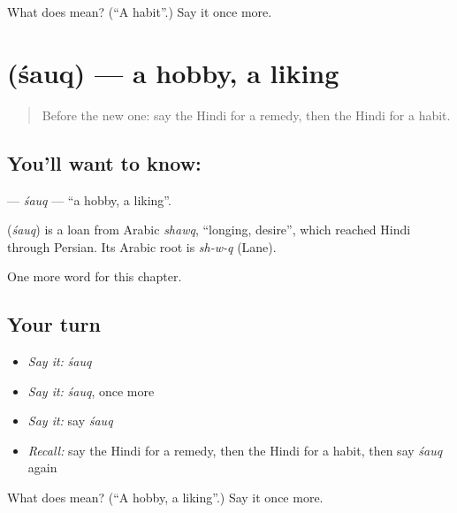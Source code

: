 \begin{tcolorbox}[breakable,colback=teal!4,colframe=teal!35!black,title={Before you move on}]
What does  mean? (\textquotedblleft{}A habit\textquotedblright{}.) Say it once more.
\end{tcolorbox}
\section[\texorpdfstring{\hi{शौक़} (śauq)}{शौक़ (śauq)}]{ (śauq) — a hobby, a liking}

\label{lesson:HI-C223-sauq}



\begin{quote}
Before the new one: say the Hindi for a remedy, then the Hindi for a habit.
\end{quote}

\subsection*{You'll want to know: }
\textbf{} — \emph{śauq} — \textquotedblleft{}a hobby, a liking\textquotedblright{}.

\begin{cousinweb}
\textbf{} (\emph{śauq}) is a loan from Arabic \emph{shawq}, \textquotedblleft{}longing, desire\textquotedblright{}, which reached Hindi through Persian. Its Arabic root is \emph{sh-w-q} (Lane).
\end{cousinweb}

\begin{grammarlens}[title={What you've built}]
One more word for this chapter.
\end{grammarlens}

\subsection*{Your turn}
\begin{itemize}
\raggedright
  \item \emph{Say it:} \emph{śauq}
  \item \emph{Say it:} \emph{śauq}, once more
  \item \emph{Say it:} say \emph{śauq}
  \item \emph{Recall:} say the Hindi for a remedy, then the Hindi for a habit, then say \emph{śauq} again
\end{itemize}

\begin{tcolorbox}[breakable,colback=teal!4,colframe=teal!35!black,title={Before you move on}]
What does  mean? (\textquotedblleft{}A hobby, a liking\textquotedblright{}.) Say it once more.
\end{tcolorbox}
